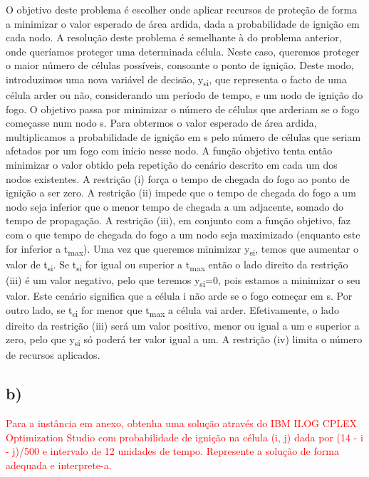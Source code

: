 \documentclass[11pt]{article} %
\begin{document}
O objetivo deste problema é escolher onde aplicar recursos de proteção de forma a minimizar o valor esperado de área ardida, dada a probabilidade de ignição em cada nodo. A resolução deste problema é semelhante à do problema anterior, onde queríamos proteger uma determinada célula. Neste caso, queremos proteger o maior número de células possíveis, consoante o ponto de ignição. Deste modo, introduzimos uma nova variável de decisão, y\textsubscript{si}, que representa o facto de uma célula arder ou não, considerando um período de tempo, e um nodo de ignição do fogo. O objetivo passa por minimizar  o número de células que arderiam se o fogo começasse num nodo s.
Para obtermos o valor esperado de área ardida, multiplicamos a probabilidade de ignição em s pelo número de células que seriam afetados por um fogo com início nesse nodo. A função objetivo tenta então minimizar o valor obtido pela repetição do cenário descrito em cada um dos nodos existentes. A restrição (i) força o tempo de chegada do fogo ao ponto de ignição a ser zero. A restrição (ii) impede que o tempo de chegada do fogo a um nodo seja inferior que o menor tempo de chegada a um adjacente, somado do tempo de propagação. A restrição (iii), em conjunto com a função objetivo, faz com o que tempo de chegada do fogo a um nodo seja maximizado (enquanto este for inferior a t\textsubscript{max}). Uma vez que queremos minimizar y\textsubscript{si}, temos que aumentar o valor de t\textsubscript{si}. Se  t\textsubscript{si} for igual ou superior a t\textsubscript{max} então o lado direito da restrição (iii) é um valor negativo, pelo que teremos y\textsubscript{si}=0, pois estamos a minimizar o seu valor. Este cenário significa que a célula i não arde se o fogo começar em s. Por outro lado, se t\textsubscript{si} for menor que  t\textsubscript{max} a célula vai arder. Efetivamente, o lado direito da restrição (iii) será um valor positivo, menor ou igual a um e superior a zero, pelo que y\textsubscript{si} só poderá ter valor igual a um. A restrição (iv) limita o número de recursos aplicados.
\subsection*{b)}
\textcolor{red}{Para a instância em anexo, obtenha uma solução através do IBM ILOG CPLEX
Optimization Studio com probabilidade de ignição na célula (i, j) dada por (14 - i -
j)/500 e intervalo de 12 unidades de tempo. Represente a solução de forma adequada
e interprete-a.}
\end{document}
